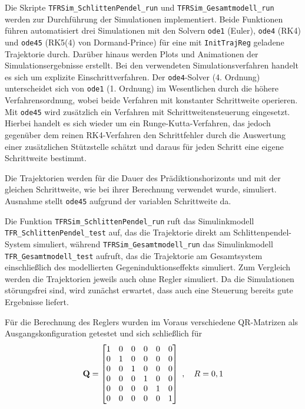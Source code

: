 Die Skripte \texttt{TFRSim\_SchlittenPendel\_run} und \texttt{TFRSim\_Gesamtmodell\_run} werden zur Durchführung der Simulationen implementiert. Beide Funktionen führen automatisiert drei Simulationen mit den Solvern \texttt{ode1} (Euler), \texttt{ode4} (RK4) und \texttt{ode45} (RK5(4) von Dormand-Prince) für eine mit \texttt{InitTrajReg} geladene Trajektorie durch. Darüber hinaus werden Plots und Animationen der Simulationsergebnisse erstellt. 
Bei den verwendeten Simulationsverfahren handelt es sich um explizite Einschrittverfahren. Der \texttt{ode4}-Solver (4. Ordnung) unterscheidet sich von \texttt{ode1} (1. Ordnung) im Wesentlichen durch die höhere Verfahrensordnung, wobei beide Verfahren mit konstanter Schrittweite operieren. Mit \texttt{ode45} wird zusätzlich ein Verfahren mit Schrittweitensteuerung eingesetzt. Hierbei handelt es sich wieder um ein Runge-Kutta-Verfahren, das jedoch gegenüber dem reinen RK4-Verfahren den Schrittfehler durch die Auswertung einer zusätzlichen Stützstelle schätzt und daraus für jeden Schritt eine eigene Schrittweite bestimmt.

Die Trajektorien werden für die Dauer des Prädiktionshorizonts und mit der gleichen Schrittweite, wie bei ihrer Berechnung verwendet wurde, simuliert. Ausnahme stellt \texttt{ode45} aufgrund der variablen Schrittweite da.

Die Funktion \texttt{TFRSim\_SchlittenPendel\_run} ruft das Simulinkmodell \texttt{TFR\_SchlittenPendel\_test} auf, das die Trajektorie direkt am Schlittenpendel-System simuliert, während \texttt{TFRSim\_Gesamtmodell\_run} das Simulinkmodell \texttt{TFR\_Gesamtmodell\_test} aufruft, das die Trajektorie am Gesamtsystem einschließlich des modellierten Gegeninduktionseffekts simuliert. Zum Vergleich werden die Trajektorien jeweils auch ohne Regler simuliert. Da die Simulationen störungsfrei sind, wird zunächst erwartet, dass auch eine Steuerung bereits gute Ergebnisse liefert.

Für die Berechnung des Reglers wurden im Voraus verschiedene QR-Matrizen als Ausgangskonfiguration getestet und sich schließlich für 
\[ 
	{\boldsymbol{\mathrm{Q}}} = 
	\begin{bmatrix}
		1 & 0 & 0 & 0 & 0 & 0 \\
		0 & 1 & 0 & 0 & 0 & 0 \\
		0 & 0 & 1 & 0 & 0 & 0 \\
		0 & 0 & 0 & 1 & 0 & 0 \\
		0 & 0 & 0 & 0 & 1 & 0 \\
		0 & 0 & 0 & 0 & 0 & 1 \\
	\end{bmatrix} \ , \quad
	R = 0,1 \\
\]

